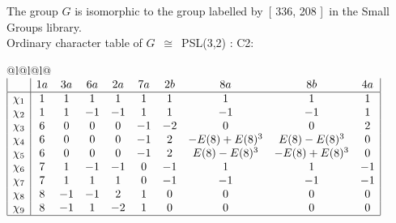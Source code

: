 \documentclass[varwidth=\maxdimen,border=10]{standalone}
\begin{document}
The group $G$ is isomorphic to the group labelled by\ [ 336, 208 ]\ in the Small Groups library.\\
Ordinary character table of $G$\ $\cong$\ PSL(3,2) : C2:\\
\begin{center}
\begin{tabular}{@{}l@{}l@{}l@{}}
\hline
\(\begin{array}{|l|ccccccccc|}
  & 1a & 3a & 6a & 2a & 7a & 2b & 8a & 8b & 4a\\ \hline
\chi_{1} & 1 & 1 & 1 & 1 & 1 & 1 & 1 & 1 & 1\\
\chi_{2} & 1 & 1 & -1 & -1 & 1 & 1 & -1 & -1 & 1\\
\chi_{3} & 6 & 0 & 0 & 0 & -1 & -2 & 0 & 0 & 2\\
\chi_{4} & 6 & 0 & 0 & 0 & -1 & 2 & -E(8)+E(8)^{3} & E(8)-E(8)^{3} & 0\\
\chi_{5} & 6 & 0 & 0 & 0 & -1 & 2 & E(8)-E(8)^{3} & -E(8)+E(8)^{3} & 0\\
\chi_{6} & 7 & 1 & -1 & -1 & 0 & -1 & 1 & 1 & -1\\
\chi_{7} & 7 & 1 & 1 & 1 & 0 & -1 & -1 & -1 & -1\\
\chi_{8} & 8 & -1 & -1 & 2 & 1 & 0 & 0 & 0 & 0\\
\chi_{9} & 8 & -1 & 1 & -2 & 1 & 0 & 0 & 0 & 0\\
\hline
\end{array}\)\\
\end{tabular}
\end{center}
\end{document}
